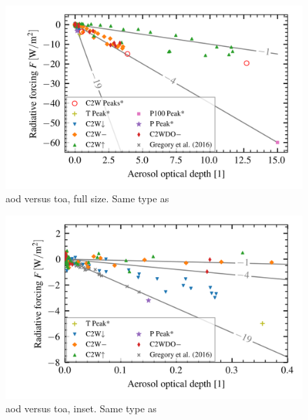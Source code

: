 \documentclass[twocol]{ametsocV5}
\begin{document}
\begin{figure}
  \begin{center}
    \includegraphics[width=0.95\linewidth]{figures/aod_vs_toa_avg_full.png}
  \end{center}
  \caption{\acrshort{aod} versus \acrshort{toa}, full size. Same type as
    \citet{gregory2016}}%
  \label{fig:aod_vs_toa_full}
\end{figure}

\begin{figure}
  \begin{center}
    \includegraphics[width=0.95\linewidth]{figures/aod_vs_toa_avg_inset.png}
  \end{center}
  \caption{\acrshort{aod} versus \acrshort{toa}, inset. Same type as
    \citet{gregory2016}}%
  \label{fig:aod_vs_toa_inset}
\end{figure}
\end{document}
